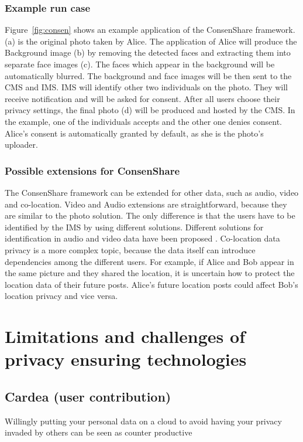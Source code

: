 \documentclass[conference]{IEEEtran}
\begin{document}
\subsubsection{Example run case}
Figure~\ref{fig:consen} shows an example application of the ConsenShare framework. (a) is the original photo taken by Alice. The application of Alice will produce the Background image (b) by removing the detected faces and extracting them into separate face images (c). The faces which appear in the background will be automatically blurred. The background and face images will be then sent to the \ac{CMS} and \ac{IMS}. \ac{IMS} will identify other two individuals on the photo. They will receive notification and will be asked for consent. After all users choose their privacy settings, the final photo (d) will be produced and hosted by the \ac{CMS}. In the example, one of the individuals accepts and the other one denies consent. Alice’s consent is automatically granted by default, as she is the photo’s uploader. 

\subsubsection{Possible extensions for ConsenShare}
The ConsenShare framework can be extended for other data, such as audio, video and co-location. Video and Audio extensions are straightforward, because they are similar to the photo solution. The only difference is that the users have to be identified by the \ac{IMS} by using different solutions. Different solutions for identification in audio and video data have been proposed \cite{reynolds2002, mansour2015}. Co-location data privacy is a more complex topic, because the data itself can introduce dependencies among the different users. For example, if Alice and Bob appear in the same picture and they shared the location, it is uncertain how to protect the location data of their future posts. Alice’s future location posts could affect Bob’s location privacy and vice versa. 

\section{Limitations and challenges of privacy ensuring technologies}\label{Limitations}

\subsection{Cardea (user contribution)}
Willingly putting your personal data on a cloud to avoid having your privacy invaded by others can be seen as counter productive
\end{document}
